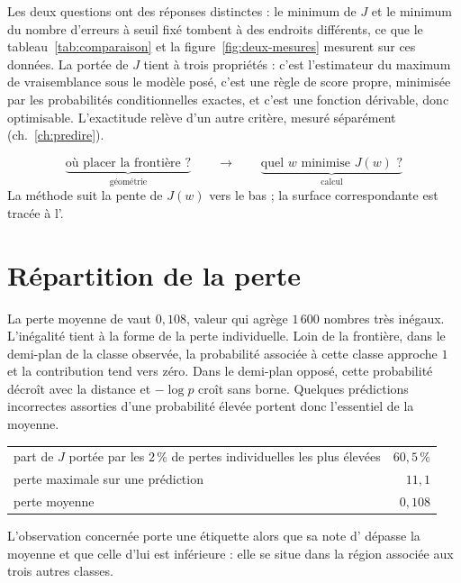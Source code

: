 \slidebreak

Les deux questions ont des réponses distinctes : le minimum de $J$ et le minimum
du nombre d'erreurs à seuil fixé tombent à des endroits différents, ce que le
tableau~\ref{tab:comparaison} et la figure~\ref{fig:deux-mesures} mesurent sur
ces données. La portée de $J$ tient à trois propriétés : c'est l'estimateur du
maximum de vraisemblance sous le modèle posé, c'est une
règle de score propre, minimisée par les probabilités conditionnelles exactes, et
c'est une fonction dérivable, donc optimisable. L'exactitude relève d'un autre
critère, mesuré séparément (ch.~\ref{ch:predire}).

\begin{resultat}
\[
  \underbrace{\text{où placer la frontière ?}}_{\text{géométrie}}
  \qquad\longrightarrow\qquad
  \underbrace{\text{quel } w \text{ minimise } J(w)\text{ ?}}_{\text{calcul}}
\]
La méthode suit la pente de $J(w)$ vers le bas ; la surface correspondante est
tracée à l'.
\end{resultat}

\section{Répartition de la perte}

La perte moyenne de \Mquatre vaut $0{,}108$, valeur qui agrège $1\,600$ nombres
très inégaux. L'inégalité tient à la forme de la perte individuelle. Loin de la
frontière, dans le demi-plan de la classe observée, la probabilité associée à
cette classe approche $1$ et la contribution tend vers zéro. Dans le demi-plan
opposé, cette probabilité décroît avec la distance et $-\log p$ croît sans
borne. Quelques prédictions incorrectes assorties d'une probabilité élevée
portent donc l'essentiel de la moyenne.

\begin{chiffres}
\begin{center}
\begin{tabular}{lr}
\toprule
part de $J$ portée par les $2\,\%$ de pertes individuelles les plus élevées & $60{,}5\,\%$ \\
perte maximale sur une prédiction & $11{,}1$ \\
perte moyenne & $0{,}108$ \\
\bottomrule
\end{tabular}
\end{center}
L'observation concernée porte une étiquette \Gryf alors que sa note d'\Herb
dépasse la moyenne et que celle d'\Runes lui est inférieure : elle se situe dans
la région associée aux trois autres classes.
\end{chiffres}


